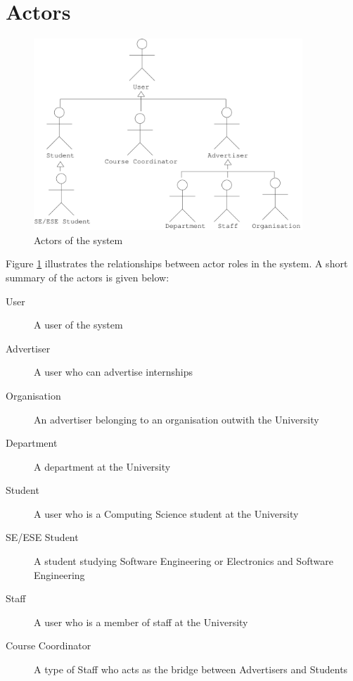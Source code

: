 \section{Actors}
\label{sec:actors}

\begin{figure}[t]
  \label{fig:actors}
  \caption{Actors of the system}
  \begin{center}
    \includegraphics[width=0.9\textwidth]{img/actors.pdf}
  \end{center}
\end{figure}

Figure \ref{fig:actors} illustrates the relationships between actor roles in the system.
A short summary of the actors is given below:

\begin{description}
\item[User]{A user of the system}
\item[Advertiser] {A user who can advertise internships}
\item[Organisation] {An advertiser belonging to an organisation outwith the University}
\item[Department] {A department at the University}
\item[Student] {A user who is a Computing Science student at the University}
\item[SE/ESE Student] {A student studying Software Engineering or Electronics and Software Engineering}
\item[Staff] {A user who is a member of staff at the University}
\item[Course Coordinator] {A type of Staff who acts as the bridge between Advertisers and Students}
\end{description}


